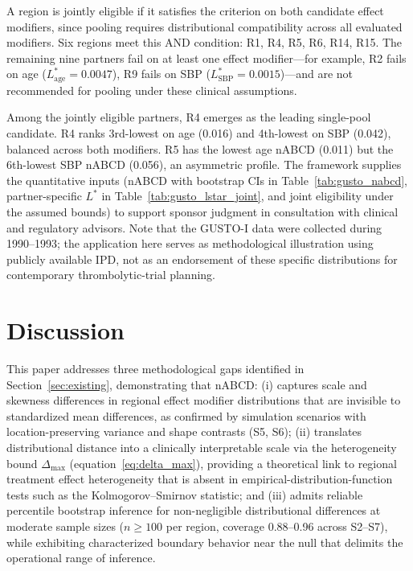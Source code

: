 \documentclass[AMA,Times1COL]{WileyNJDv5}
\begin{document}
A region is jointly eligible if it satisfies the criterion on both candidate effect modifiers, since pooling requires distributional compatibility across all evaluated modifiers. Six regions meet this AND condition: R1, R4, R5, R6, R14, R15. The remaining nine partners fail on at least one effect modifier---for example, R2 fails on age ($L^*_{\text{age}} = 0.0047$), R9 fails on SBP ($L^*_{\text{SBP}} = 0.0015$)---and are not recommended for pooling under these clinical assumptions.

Among the jointly eligible partners, R4 emerges as the leading single-pool candidate. R4 ranks 3rd-lowest on age (0.016) and 4th-lowest on SBP (0.042), balanced across both modifiers. R5 has the lowest age nABCD (0.011) but the 6th-lowest SBP nABCD (0.056), an asymmetric profile. The framework supplies the quantitative inputs (nABCD with bootstrap CIs in Table~\ref{tab:gusto_nabcd}, partner-specific $L^*$ in Table~\ref{tab:gusto_lstar_joint}, and joint eligibility under the assumed bounds) to support sponsor judgment in consultation with clinical and regulatory advisors. Note that the GUSTO-I data were collected during 1990--1993; the application here serves as methodological illustration using publicly available IPD, not as an endorsement of these specific distributions for contemporary thrombolytic-trial planning.

\section{Discussion}\label{sec:discussion}

This paper addresses three methodological gaps identified in Section~\ref{sec:existing}, demonstrating that nABCD: (i) captures scale and skewness differences in regional effect modifier distributions that are invisible to standardized mean differences, as confirmed by simulation scenarios with location-preserving variance and shape contrasts (S5, S6); (ii) translates distributional distance into a clinically interpretable scale via the heterogeneity bound \(\Delta_{\max}\) (equation~\ref{eq:delta_max}), providing a theoretical link to regional treatment effect heterogeneity that is absent in empirical-distribution-function tests such as the Kolmogorov--Smirnov statistic; and (iii) admits reliable percentile bootstrap inference for non-negligible distributional differences at moderate sample sizes (\(n \geq 100\) per region, coverage 0.88--0.96 across S2--S7), while exhibiting characterized boundary behavior near the null that delimits the operational range of inference.
\end{document}
